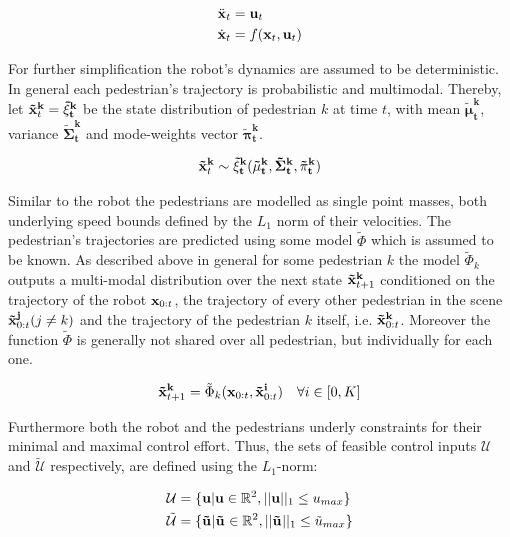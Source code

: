 \begin{align}
\ddot{\mathbf{x}}_t &= \mathbf{u}_t \\
\dot{\mathbf{x}}_t &= f(\mathbf{x}_t, \mathbf{u}_t)
\label{eq:robot_dynamics}
\end{align}

For further simplification the robot's dynamics are assumed to be deterministic.
\newline
In general each pedestrian's trajectory is probabilistic and multimodal. Thereby,  let $\xped[k]_t = \mathbf{\tilde{\xi}_t^k}$ be the state distribution of pedestrian $k$ at time $t$, with mean $\mathbf{\tilde{\mu}_t^k}$, variance $\mathbf{\tilde{\Sigma}_t^k}$ and mode-weights vector $\mathbf{\tilde{\pi}_t^k}$. 

\begin{equation}
\xped[k]_t \sim \mathbf{\tilde{\xi}_t^k}(\mathbf{\tilde{\mu}_t^k}, \mathbf{\tilde{\Sigma}_t^k}, \mathbf{\tilde{\pi}_t^k})	
\end{equation}

Similar to the robot the pedestrians are modelled as single point masses, both underlying speed bounds defined by the $L_1$ norm of their velocities. 
\newline
The pedestrian's trajectories are predicted using some model $\tilde{\Phi}$ which is assumed to be known. As described above in general for some pedestrian $k$ the model $\tilde{\Phi}_k$ outputs a multi-modal distribution over the next state $\xped[k]_{t+1}$ conditioned on the trajectory of the robot $\mathbf{x}_{0:t}$, the trajectory of every other pedestrian in the scene $\xped[j]_{0:t} (j \neq k)$ and the trajectory of the pedestrian $k$ itself, i.e. $\xped[k]_{0:t}$. Moreover the function $\tilde{\Phi}$ is generally not shared over all pedestrian, but individually for each one.

\begin{equation}
\xped[k]_{t+1} = \tilde{\Phi}_k(\x_{0:t}, \xped[i]_{0:t}) \quad \forall i \in [0, K]	
\end{equation}

Furthermore both the robot and the pedestrians underly constraints for their minimal and maximal control effort. Thus, the sets of feasible control inputs $\mathcal{U}$ and $\mathcal{\tilde{U}}$ respectively, are defined using the $L_1$-norm:

\begin{align}
\mathcal{U} &= \{\u | \u \in \mathbb{R}^2, ||\u||_1 \leq u_{max}\} \\
\mathcal{\tilde{U}} &= \{\uped[] | \uped[] \in \mathbb{R}^2, ||\uped[]||_1 \leq \tilde{u}_{max}\} 
\label{eq:controls_bounds}
\end{align}
 

